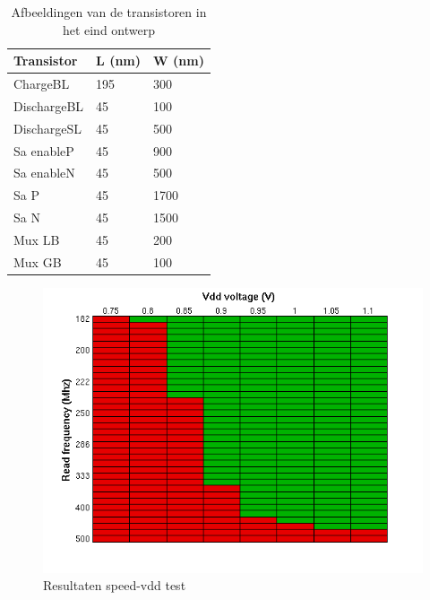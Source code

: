 \begin{table}
\begin{center}
\begin{tabularx}{\textwidth}{XXX}
\hline
Transistor & L (nm) & W (nm)\\
\hline
ChargeBL & 195 & 300 \\
DischargeBL & 45 & 100 \\
DischargeSL & 45 & 500 \\
Sa enableP & 45 & 900 \\
Sa enableN & 45 & 500 \\
Sa P & 45 & 1700 \\
Sa N & 45 & 1500 \\
Mux LB & 45 & 200 \\
Mux GB & 45 & 100 \\
\hline
\end{tabularx}
\end{center}
\caption[Transistor afmetingen eind ontwerp]{Afbeeldingen van de transistoren in het eind ontwerp}
\label{tab:transsize}
\end{table}
	
\begin{figure}[!ht]
  \centering
  \includegraphics[scale=0.8]{../fig/hfdst-final-vddspeed.png}
  \caption[Resultaten speed-vdd test]{Resultaten speed-vdd test}
  \label{fig:speedvdd}
\end{figure}

